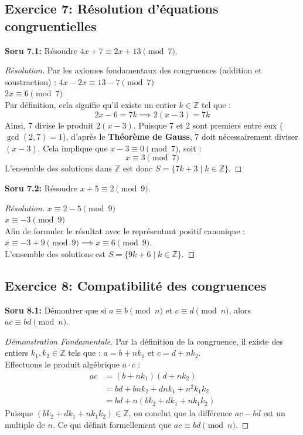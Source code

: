 \documentclass[12pt,a4paper]{report}
\begin{document}
\subsection*{Exercice 7: Résolution d'équations congruentielles}
\textbf{Soru 7.1:} Résoudre $4x + 7 \equiv 2x + 13 \pmod{7}$.
\begin{proof}[Résolution]
Par les axiomes fondamentaux des congruences (addition et soustraction) :
$4x - 2x \equiv 13 - 7 \pmod{7}$ \\
$2x \equiv 6 \pmod{7}$ \\
Par définition, cela signifie qu'il existe un entier $k \in \mathbb{Z}$ tel que :
\[ 2x - 6 = 7k \implies 2(x - 3) = 7k \]
Ainsi, 7 divise le produit $2(x - 3)$. Puisque 7 et 2 sont premiers entre eux ($\gcd(2, 7) = 1$), d'après le \textbf{Théorème de Gauss}, 7 doit nécessairement diviser $(x - 3)$.
Cela implique que $x - 3 \equiv 0 \pmod{7}$, soit :
\[ x \equiv 3 \pmod{7} \]
L'ensemble des solutions dans $\mathbb{Z}$ est donc $S = \{7k + 3 \mid k \in \mathbb{Z}\}$.
\end{proof}

\textbf{Soru 7.2:} Résoudre $x + 5 \equiv 2 \pmod{9}$.
\begin{proof}[Résolution]
$x \equiv 2 - 5 \pmod{9}$ \\
$x \equiv -3 \pmod{9}$ \\
Afin de formuler le résultat avec le représentant positif canonique :
$x \equiv -3 + 9 \pmod{9} \implies x \equiv 6 \pmod{9}$. \\
L'ensemble des solutions est $S = \{9k + 6 \mid k \in \mathbb{Z}\}$.
\end{proof}

\subsection*{Exercice 8: Compatibilité des congruences}
\textbf{Soru 8.1:} Démontrer que si $a \equiv b \pmod{n}$ et $c \equiv d \pmod{n}$, alors $ac \equiv bd \pmod{n}$.
\begin{proof}[Démonstration Fondamentale]
Par la définition de la congruence, il existe des entiers $k_1, k_2 \in \mathbb{Z}$ tels que :
$a = b + n k_1$ et $c = d + n k_2$. \\
Effectuons le produit algébrique $a \cdot c$ :
\begin{align*}
ac &= (b + n k_1)(d + n k_2) \\
&= bd + b n k_2 + d n k_1 + n^2 k_1 k_2 \\
&= bd + n(b k_2 + d k_1 + n k_1 k_2)
\end{align*}
Puisque $(b k_2 + d k_1 + n k_1 k_2) \in \mathbb{Z}$, on conclut que la différence $ac - bd$ est un multiple de $n$.
Ce qui définit formellement que $ac \equiv bd \pmod{n}$.
\end{proof}
\end{document}
